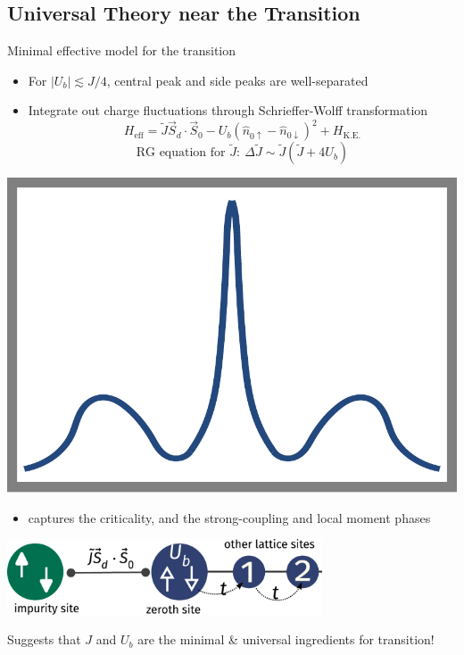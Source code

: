 \documentclass[8pt,aspectratio=169]{beamer}
\newcommand{\nitem}{\item[\ding{51}]}
\begin{document}
\begin{frame}{}
\section{Universal Theory near the Transition}
\end{frame}
\begin{frame}{Minimal effective model for the transition}
\centering
\begin{minipage}{0.65\textwidth}
\begin{itemize}
	\nitem For \(|U_b| \lesssim J/4\), central peak and side peaks are \alert{well-separated} \\[10pt]
	\nitem \alert{Integrate out} charge fluctuations through Schrieffer-Wolff transformation
\[H_\text{eff} = \tilde J \vec{S}_d\cdot\vec{S}_0 - U_b\left(\hat n_{0 \uparrow} - \hat n_{0 \downarrow}\right)^2 + H_\text{K.E.}\]
\[ \text{RG equation for } \tilde J: ~ \Delta \tilde J \sim \tilde J \left( \tilde J  + 4U_b \right) \]
\end{itemize}
\end{minipage}
\hspace*{\fill}
\begin{minipage}{0.3\textwidth}
\includegraphics[width=\textwidth]{separation.pdf}
\end{minipage}

\begin{itemize}
\nitem \alert{captures} the criticality, and the strong-coupling and local moment phases
\end{itemize}

\includegraphics[width=0.7\textwidth]{universal-theory.pdf}

\vspace*{\fill}

Suggests that \alert{$J$ and $U_b$ are the minimal \& universal ingredients} for transition!

\end{frame}
\end{document}
